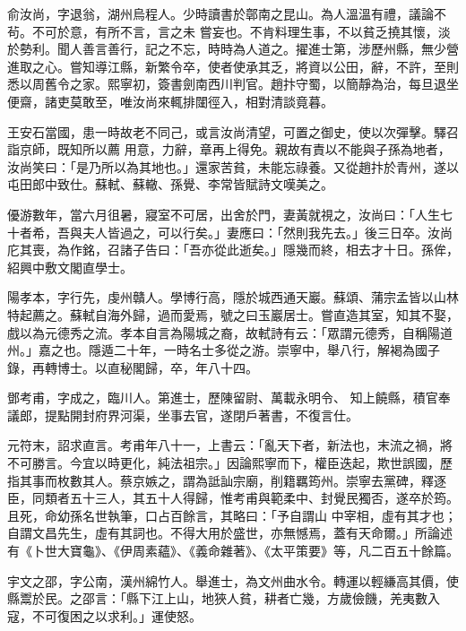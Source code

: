 \begin{pinyinscope}
 俞汝尚，字退翁，湖州烏程人。少時讀書於鄣南之昆山。為人溫溫有禮，議論不茍。不可於意，有所不言，言之未
 嘗妄也。不肯料理生事，不以貧乏撓其懷，淡於勢利。聞人善言善行，記之不忘，時時為人道之。擢進士第，涉歷州縣，無少營進取之心。嘗知導江縣，新繁令卒，使者使承其乏，將資以公田，辭，不許，至則悉以周舊令之家。熙寧初，簽書劍南西川判官。趙抃守蜀，以簡靜為治，每旦退坐便齋，諸吏莫敢至，唯汝尚來輒排闥徑入，相對清談竟暮。



 王安石當國，患一時故老不同己，或言汝尚清望，可置之御史，使以次彈擊。驛召詣京師，既知所以薦
 用意，力辭，章再上得免。親故有責以不能與子孫為地者，汝尚笑曰：「是乃所以為其地也。」還家苦貧，未能忘祿養。又從趙抃於青州，遂以屯田郎中致仕。蘇軾、蘇轍、孫覺、李常皆賦詩文嘆美之。



 優游數年，當六月徂暑，寢室不可居，出舍於門，妻黃就視之，汝尚曰：「人生七十者希，吾與夫人皆過之，可以行矣。」妻應曰：「然則我先去。」後三日卒。汝尚庀其喪，為作銘，召諸子告曰：「吾亦從此逝矣。」隱幾而終，相去才十日。孫侔，紹興中敷文閣直學士。



 陽孝本，字行先，虔州贛人。學博行高，隱於城西通天巖。蘇頌、蒲宗孟皆以山林特起薦之。蘇軾自海外歸，過而愛焉，號之曰玉巖居士。嘗直造其室，知其不娶，戲以為元德秀之流。孝本自言為陽城之裔，故軾詩有云：「眾謂元德秀，自稱陽道州。」嘉之也。隱遁二十年，一時名士多從之游。崇寧中，舉八行，解褐為國子錄，再轉博士。以直秘閣歸，卒，年八十四。



 鄧考甫，字成之，臨川人。第進士，歷陳留尉、萬載永明令、
 知上饒縣，積官奉議郎，提點開封府界河渠，坐事去官，遂閉戶著書，不復言仕。



 元符末，詔求直言。考甫年八十一，上書云：「亂天下者，新法也，末流之禍，將不可勝言。今宜以時更化，純法祖宗。」因論熙寧而下，權臣迭起，欺世誤國，歷指其事而枚數其人。蔡京嫉之，謂為詆訕宗廟，削籍羈筠州。崇寧去黨碑，釋逐臣，同類者五十三人，其五十人得歸，惟考甫與範柔中、封覺民獨否，遂卒於筠。且死，命幼孫名世執筆，口占百餘言，其略曰：「予自謂山
 中宰相，虛有其才也；自謂文昌先生，虛有其詞也。不得大用於盛世，亦無憾焉，蓋有天命爾。」所論述有《卜世大寶龜》、《伊周素蘊》、《義命雜著》、《太平策要》等，凡二百五十餘篇。



 宇文之邵，字公南，漢州綿竹人。舉進士，為文州曲水令。轉運以輕縑高其價，使縣鬻於民。之邵言：「縣下江上山，地狹人貧，耕者亡幾，方歲儉饑，羌夷數入寇，不可復困之以求利。」運使怒。




\end{pinyinscope}
